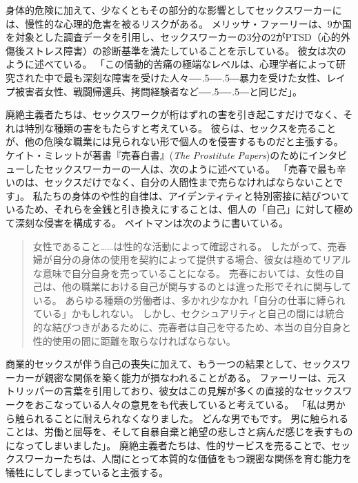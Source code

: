 \documentclass[paper=a4,book,openany]{jlreq}
\def\DDASH{―\kern-.5\zw―\kern-.5\zw―} %
\begin{document}
身体的危険に加えて、少なくともその部分的な影響としてセックスワーカーには、慢性的な心理的危害を被るリスクがある。
メリッサ・ファーリーは、9か国を対象とした調査データを引用し、セックスワーカーの3分の2がPTSD（心的外傷後ストレス障害）の診断基準を満たしていることを示している。
彼女は次のように述べている。
「この情動的苦痛の極端なレベルは、心理学者によって研究された中で最も深刻な障害を受けた人々{\DDASH}暴力を受けた女性、レイプ被害者女性、戦闘帰還兵、拷問経験者など{\DDASH}と同じだ」\citep[p.100]{farley18:_risks_prost}。

廃絶主義者たちは、セックスワークが桁はずれの害を引き起こすだけでなく、それは特別な種類の害をもたらすと考えている。
彼らは、セックスを売ることが、他の危険な職業には見られない形で個人のを侵害するものだと主張する。
ケイト・ミレットが著書『売春白書』(\emph{The Prostitute Papers})のためにインタビューしたセックスワーカーの一人は、次のように述べている。
「売春で最も辛いのは、セックスだけでなく、自分の人間性まで売らなければならないことです」\citep[p.84]{millett76:_prost_paper}。
私たちの身体のや性的自律は、アイデンティティと特別密接に結びついているため、それらを金銭と引き換えにすることは、個人の「自己」に対して極めて深刻な侵害を構成する。
ペイトマンは次のように書いている。

\begin{quote}
女性であること……は性的な活動によって確認される。
したがって、売春婦が自分の身体の使用を契約によって提供する場合、彼女は極めてリアルな意味で自分自身を売っていることになる。
売春においては、女性の自己は、他の職業における自己が関与するのとは違った形でそれに関与している。
あらゆる種類の労働者は、多かれ少なかれ「自分の仕事に縛られている」かもしれない。
しかし、セクシュアリティと自己の間には統合的な結びつきがあるために、売春者は自己を守るため、本当の自分自身と性的使用の間に距離を取らなければならない。
\citep{pateman88:_sexual_contr}
\end{quote}

商業的セックスが伴う自己の喪失に加えて、もう一つの結果として、セックスワーカーが親密な関係を築く能力が損なわれることがある。
ファーリーは、元ストリッパーの言葉を引用しており、彼女はこの見解が多くの直接的なセックスワークをおこなっている人々の意見をも代表していると考えている。
「私は男から触られることに耐えられなくなりました。
どんな男でもです。
男に触られることは、労働と屈辱を、そして自暴自棄と絶望の悲しさと病んだ感じを表すものになってしまいました」\citep{farley13:_prost_liber_slaver}。
廃絶主義者たちは、性的サービスを売ることで、セックスワーカーたちは、人間にとって本質的な価値をもつ親密な関係を育む能力を犠牲にしてしまっていると主張する。
\end{document}
